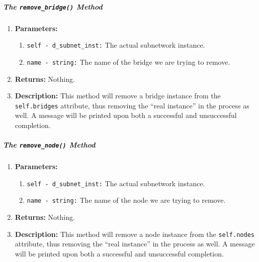        \subparagraph{The \texttt{remove\_bridge()} Method}
            \begin{enumerate}
                \item \textbf{Parameters:}
                \begin{enumerate}
                    \item \texttt{self - d\_subnet\_inst:} The actual subnetwork instance.
                    \item \texttt{name - string:} The name of the bridge we are trying to remove.
                \end{enumerate}
                \item \textbf{Returns:} Nothing.
                \item \textbf{Description:} This method will remove a bridge instance from the \texttt{self.bridges} attribute, thus removing the ``real instance'' in the process as well. A message will be printed upon both a successful and unsuccessful completion.
            \end{enumerate}

        \subparagraph{The \texttt{remove\_node()} Method}
            \begin{enumerate}
                \item \textbf{Parameters:}
                \begin{enumerate}
                    \item \texttt{self - d\_subnet\_inst:} The actual subnetwork instance.
                    \item \texttt{name - string:} The name of the node we are trying to remove.
                \end{enumerate}
                \item \textbf{Returns:} Nothing.
                \item \textbf{Description:} This method will remove a node instance from the \texttt{self.nodes} attribute, thus removing the ``real instance'' in the process as well. A message will be printed upon both a successful and unsuccessful completion.
            \end{enumerate}

